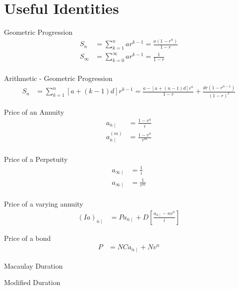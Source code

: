 \documentclass[12pt,twoside]{article}
\begin{document}



\section {Useful Identities}

Geometric Progression
\begin{align*}
S_n &= \sum_{k=1}^n ar^{k-1}  =\frac{a(1-r^n)}{1-r}\\
S_\infty &= \sum_{k=0}^\infty ar^{k-1} = \frac{1}{1-r}\\
\end{align*}

Arithmetic - Geometric Progression
\begin{align*}
S_n & = \sum_{k=1}^n\left[a + (k-1)d\right]r^{k-1}= \frac{a-\left[a+(n-1)d\right]r^n}{1-r}+\frac{dr(1-r^{n-1})}{(1-r)^2}
\end{align*}

Price of an Annuity
\begin{align*}
a_{\overline{n}\mid} & = \frac{1-v^n}{i}\\
a_{\overline{n}\mid}^{(m)} & = \frac{1-v^n}{r^{m}}\\
\end{align*}

Price of a Perpetuity
\begin{align*}
a_{\overline{\infty}\mid} & = \frac{1}{i}\\
a_{\overline{\infty}\mid} & = \frac{1}{r^{m}}\\
\end{align*}

Price of a varying annuity
\begin{align*}
(Ia)_{\overline{n}\mid} & = Pa_{\overline{n}\mid} + D\left[\frac{a_{\overline{n}\mid} - nv^n}{i}\right]
\end{align*}

Price of a bond
\begin{align*}
P & = NCa_{\overline{n}\mid} + Nv^n
\end{align*}

Macaulay Duration


Modified Duration
\end{document}
